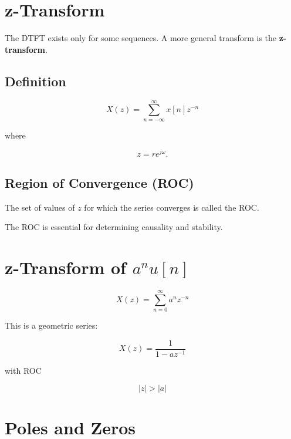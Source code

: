 
\section{z-Transform}

The DTFT exists only for some sequences. A more general transform is the
\textbf{z-transform}.


\subsection{Definition}

\[
\boxed{
X(z)=
\sum_{n=-\infty}^{\infty}
x[n]z^{-n}
}
\]

where

\[
z=re^{j\omega}.
\]


\subsection{Region of Convergence (ROC)}

The set of values of \(z\) for which the series converges is called the ROC.

The ROC is essential for determining causality and stability.


\section{z-Transform of \(a^n u[n]\)}

\[
X(z)=
\sum_{n=0}^{\infty}a^n z^{-n}
\]

This is a geometric series:

\[
X(z)=
\frac{1}{1-az^{-1}}
\]

with ROC

\[
\boxed{
|z|>|a|
}
\]


\section{Poles and Zeros}

